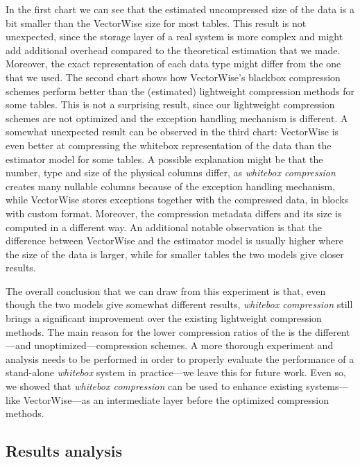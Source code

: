 In the first chart we can see that the estimated uncompressed size of the data is a bit smaller than the VectorWise size for most tables. This result is not unexpected, since the storage layer of a real system is more complex and might add additional overhead compared to the theoretical estimation that we made. Moreover, the exact representation of each data type might differ from the one that we used. The second chart shows how VectorWise's blackbox compression schemes perform better than the (estimated) lightweight compression methods for some tables. This is not a surprising result, since our lightweight compression schemes are not optimized and the exception handling mechanism is different. A somewhat unexpected result can be observed in the third chart: VectorWise is even better at compressing the whitebox representation of the data than the estimator model for some tables. A possible explanation might be that the number, type and size of the physical columns differ, as \textit{whitebox compression} creates many nullable columns because of the exception handling mechanism, while VectorWise stores exceptions together with the compressed data, in blocks with custom format. Moreover, the compression metadata differs and its size is computed in a different way. An additional notable observation is that the difference between VectorWise and the estimator model is usually higher where the size of the data is larger, while for smaller tables the two models give closer results.

The overall conclusion that we can draw from this experiment is that, even though the two models give somewhat different results, \textit{whitebox compression} still brings a significant improvement over the existing lightweight compression methods. The main reason for the lower compression ratios of the  is the different---and unoptimized---compression schemes. A more thorough experiment and analysis needs to be performed in order to properly evaluate the performance of a stand-alone \textit{whitebox} system in practice---we leave this for future work. Even so, we showed that \textit{whitebox compression} can be used to enhance existing systems---like VectorWise---as an intermediate layer before the optimized compression methods.



\subsection{Results analysis}
\label{subsec:eval:results:analysis}

